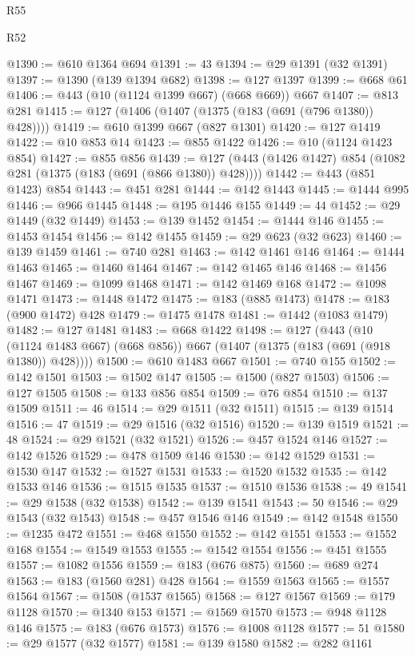\begin{lexlean}{R55}
\begin{lexlean}{R52}
\begin{coremodule}
{{{{{{{{{{{{{{{{{{{{{{{{{{{{{{{{{{{{{{{{{{{{{{{{{{{{{{{{{{{{{{{{{{{{{{{{{{{{{{{{{{{{{{{{{{{{{{{{{{{{{{{{{{{{{{{{{{{{{{{{{{{{{{{{{{{{{{{{{{{{{{{{{{{{{{{{{{{{{{{{{{{{{{{{{{{{{{{{{{{{{{{{{{{{{{{{{{{{{{@1390 := @610 @1364 @694
@1391 := 43
@1394 := @29 @1391 (@32 @1391)
@1397 := @1390 (@139 @1394 @682)
@1398 := @127 @1397
@1399 := @668 @61
@1406 := @443 (@10 (@1124 @1399 @667) (@668 @669)) @667
@1407 := @813 @281
@1415 := @127 (@1406 (@1407 (@1375 (@183 (@691 (@796 @1380)) @428))))
@1419 := @610 @1399 @667 (@827 @1301)
@1420 := @127 @1419
@1422 := @10 @853 @14
@1423 := @855 @1422
@1426 := @10 (@1124 @1423 @854)
@1427 := @855 @856
@1439 := @127 (@443 (@1426 @1427) @854 (@1082 @281 (@1375 (@183 (@691 (@866 @1380)) @428))))
@1442 := @443 (@851 @1423) @854
@1443 := @451 @281
@1444 := @142 @1443
@1445 := @1444 @995
@1446 := @966 @1445
@1448 := @195 @1446 @155
@1449 := 44
@1452 := @29 @1449 (@32 @1449)
@1453 := @139 @1452
@1454 := @1444 @146
@1455 := @1453 @1454
@1456 := @142 @1455
@1459 := @29 @623 (@32 @623)
@1460 := @139 @1459
@1461 := @740 @281
@1463 := @142 @1461 @146
@1464 := @1444 @1463
@1465 := @1460 @1464
@1467 := @142 @1465 @146
@1468 := @1456 @1467
@1469 := @1099 @1468
@1471 := @142 @1469 @168
@1472 := @1098 @1471
@1473 := @1448 @1472
@1475 := @183 (@885 @1473)
@1478 := @183 (@900 @1472) @428
@1479 := @1475 @1478
@1481 := @1442 (@1083 @1479)
@1482 := @127 @1481
@1483 := @668 @1422
@1498 := @127
    (@443 (@10 (@1124 @1483 @667) (@668 @856)) @667 (@1407 (@1375 (@183 (@691 (@918 @1380)) @428))))
@1500 := @610 @1483 @667
@1501 := @740 @155
@1502 := @142 @1501
@1503 := @1502 @147
@1505 := @1500 (@827 @1503)
@1506 := @127 @1505
@1508 := @133 @856 @854
@1509 := @76 @854
@1510 := @137 @1509
@1511 := 46
@1514 := @29 @1511 (@32 @1511)
@1515 := @139 @1514
@1516 := 47
@1519 := @29 @1516 (@32 @1516)
@1520 := @139 @1519
@1521 := 48
@1524 := @29 @1521 (@32 @1521)
@1526 := @457 @1524 @146
@1527 := @142 @1526
@1529 := @478 @1509 @146
@1530 := @142 @1529
@1531 := @1530 @147
@1532 := @1527 @1531
@1533 := @1520 @1532
@1535 := @142 @1533 @146
@1536 := @1515 @1535
@1537 := @1510 @1536
@1538 := 49
@1541 := @29 @1538 (@32 @1538)
@1542 := @139 @1541
@1543 := 50
@1546 := @29 @1543 (@32 @1543)
@1548 := @457 @1546 @146
@1549 := @142 @1548
@1550 := @1235 @472
@1551 := @468 @1550
@1552 := @142 @1551
@1553 := @1552 @168
@1554 := @1549 @1553
@1555 := @1542 @1554
@1556 := @451 @1555
@1557 := @1082 @1556
@1559 := @183 (@676 @875)
@1560 := @689 @274
@1563 := @183 (@1560 @281) @428
@1564 := @1559 @1563
@1565 := @1557 @1564
@1567 := @1508 (@1537 @1565)
@1568 := @127 @1567
@1569 := @179 @1128
@1570 := @1340 @153
@1571 := @1569 @1570
@1573 := @948 @1128 @146
@1575 := @183 (@676 @1573)
@1576 := @1008 @1128
@1577 := 51
@1580 := @29 @1577 (@32 @1577)
@1581 := @139 @1580
@1582 := @282 @1161
}}}}}}}}}}}}}}}}}}}}}}}}}}}}}}}}}}}}}}}}}}}}}}}}}}}}}}}}}}}}}}}}}}}}}}}}}}}}}}}}}}}}}}}}}}}}}}}}}}}}}}}}}}}}}}}}}}}}}}}}}}}}}}}}}}}}}}}}}}}}}}}}}}}}}}}}}}}}}}}}}}}}}}}}}}}}}}}}}}}}}}}}}}}}}}}}}}}}}}
\end{coremodule}
\end{lexlean}
\end{lexlean}
